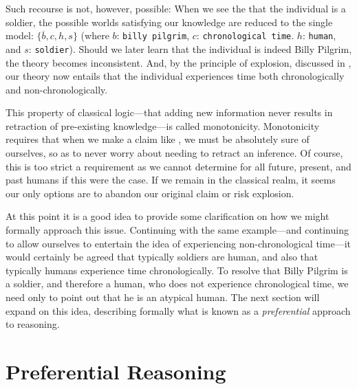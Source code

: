Such recourse is not, however, possible: When we see the that the individual is a soldier, the possible worlds satisfying our knowledge are reduced to the single model: $\{\overline{b},c,h,s\}$ (where $b$: \texttt{billy pilgrim}, $c$: \texttt{chronological time}. $h$: \texttt{human}, and $s$: \texttt{soldier}). Should we later learn that the individual is indeed Billy Pilgrim, the theory becomes inconsistent.
And, by the principle of explosion, discussed in , our theory now entails that the individual experiences time both chronologically and non-chronologically.

This property of classical logic---that adding new information never results in retraction of pre-existing knowledge---is called monotonicity. Monotonicity requires that when we make a claim like , we must be absolutely sure of ourselves, so as to never worry about needing to retract an inference. Of course, this is too strict a requirement as we cannot determine for all future, present, and past humans if this were the case. If we remain in the classical realm, it seems our only options are to abandon our original claim or risk explosion.

At this point it is a good idea to provide some clarification on how we might formally approach this issue. Continuing with the same example---and continuing to allow ourselves to entertain the idea of experiencing non-chronological time---it would certainly be agreed that typically soldiers are human, and also that typically humans experience time chronologically. To resolve that Billy Pilgrim is a soldier, and therefore a human, who does not experience chronological time, we need only to point out that he is an atypical human. The next section will expand on this idea, describing formally what is known as a \textit{preferential} approach to reasoning.

\section{Preferential Reasoning}
\label{section:preferential-reasoning}
